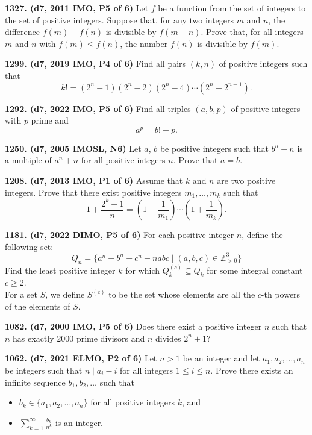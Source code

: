 \documentclass{article}
\begin{document}
\textbf{1327. (\color{red}d7\color{black}, 2011 IMO, P5 of 6)} Let $f$ be a function from the set of integers to the set of positive integers. Suppose that, for any two integers $m$ and $n$, the difference $f(m) - f(n)$ is divisible by $f(m- n)$. Prove that, for all integers $m$ and $n$ with $f(m) \leq f(n)$, the number $f(n)$ is divisible by $f(m)$.

\textbf{1299. (\color{red}d7\color{black}, 2019 IMO, P4 of 6)} Find all pairs $(k,n)$ of positive integers such that \[ k!=(2^n-1)(2^n-2)(2^n-4)\cdots(2^n-2^{n-1}). \]

\textbf{1292. (\color{red}d7\color{black}, 2022 IMO, P5 of 6)} Find all triples $(a,b,p)$ of positive integers with $p$ prime and $$a^p=b!+p.$$

\textbf{1250. (\color{red}d7\color{black}, 2005 IMOSL, N6)} Let $a$, $b$ be positive integers such that $b^n+n$ is a multiple of $a^n+n$ for all positive integers $n$. Prove that $a=b$.

\textbf{1208. (\color{red}d7\color{black}, 2013 IMO, P1 of 6)} Assume that $k$ and $n$ are two positive integers. Prove that there exist positive integers $m_1 , \dots , m_k$ such that \[1+\frac{2^k-1}{n}=\left(1+\frac1{m_1}\right)\cdots \left(1+\frac1{m_k}\right).\]

\textbf{1181. (\color{red}d7\color{black}, 2022 DIMO, P5 of 6)} For each positive integer $n$, define the following set: \[Q_n=\{a^n+b^n+c^n-nabc\mid (a,b,c)\in \mathbb{Z}_{>0}^3\}\] Find the least positive integer $k$ for which $Q_k^{(c)}\subseteq Q_k$ for some integral constant $c\geq 2$.\\ For a set $S$, we define $S^{(c)}$ to be the set whose elements are all the $c$-th powers of the elements of $S$.

\textbf{1082. (\color{red}d7\color{black}, 2000 IMO, P5 of 6)} Does there exist a positive integer $ n$ such that $ n$ has exactly 2000 prime divisors and $ n$ divides $ 2^n + 1$?

\textbf{1062. (\color{red}d7\color{black}, 2021 ELMO, P2 of 6)} Let $n > 1$ be an integer and let $a_1, a_2, \ldots, a_n$ be integers such that $n \mid a_i-i$ for all integers $1 \leq i \leq n$. Prove there exists an infinite sequence $b_1,b_2, \ldots$ such that
\begin{itemize}
    \item $b_k\in\{a_1,a_2,\ldots, a_n\}$ for all positive integers $k$, and
    \item $\sum\limits_{k=1}^{\infty}\frac{b_k}{n^k}$ is an integer.
\end{itemize}
\end{document}
